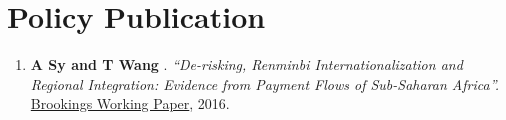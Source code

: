 
\section{Policy Publication}
\vspace{-.25in}
\begin{enumerate}
	\item {\bf A Sy and T Wang }. \textit{``De-risking, Renminbi Internationalization and Regional Integration: Evidence from Payment Flows of Sub-Saharan Africa''.} \href{https://www.brookings.edu/research/de-risking-renminbi-internationalization-and-regional-integration/}{Brookings Working Paper}, 2016.
\end{enumerate} 
